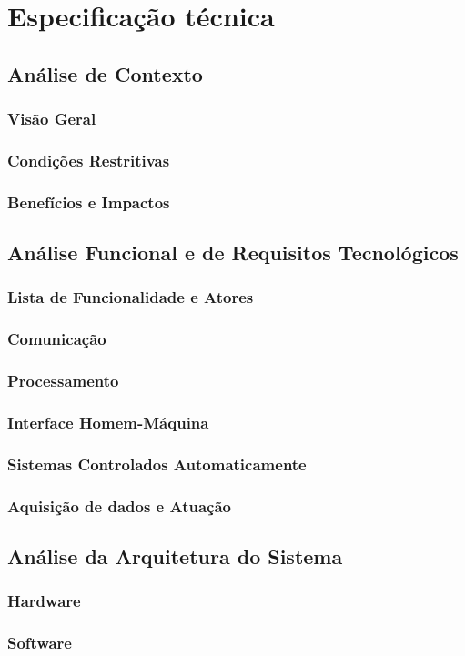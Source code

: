 \chapter{Especificação técnica} \label{cap:especificacao_tecnica}

\section{Análise de Contexto}
\subsection{Visão Geral}
\subsection{Condições Restritivas}
\subsection{Benefícios e Impactos}

\section{Análise Funcional e de Requisitos Tecnológicos}
\subsection{Lista de Funcionalidade e Atores}
\subsection{Comunicação}
\subsection{Processamento}
\subsection{Interface Homem-Máquina}
\subsection{Sistemas Controlados Automaticamente}
\subsection{Aquisição de dados e Atuação}

\section{Análise da Arquitetura do Sistema}
\subsection{Hardware}
\subsection{Software}

